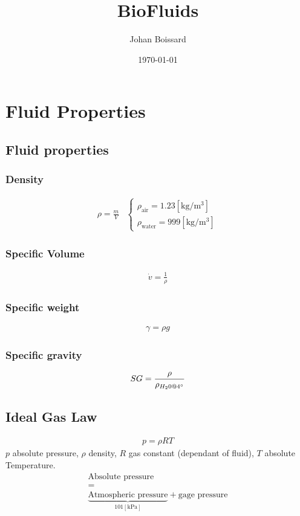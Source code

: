 \documentclass[a4paper]{amsart}
\title{BioFluids}
\author{Johan Boissard}
\date\today
\begin{document}
\twocolumn



\section{Fluid Properties}
\subsection{Fluid properties}
\subsubsection{Density}
\begin{eqnarray*}
	\rho=\frac{m}{V}&
	\begin{cases}
		\rho_\text{air}=1.23 [\text{kg/m$^3$}]\\
		\rho_\text{water}=999 [\text{kg/m$^3$}]
	\end{cases}
\end{eqnarray*}
\subsubsection{Specific Volume}
\begin{eqnarray*}
	\dot v=\frac{1}{\rho}
\end{eqnarray*}
\subsubsection{Specific weight}
\begin{eqnarray*}
	\gamma=\rho g
\end{eqnarray*}
\subsubsection{Specific gravity}
\begin{eqnarray*}
	SG=\frac{\rho}{\rho_{H_20@4\degree}}
\end{eqnarray*}
\subsection{Ideal Gas Law}
\begin{eqnarray*}
	p=\rho RT
\end{eqnarray*}
$p$ absolute pressure, $\rho$ density, $R$ gas constant (dependant of fluid), $T$ absolute Temperature.
\begin{eqnarray*}
	&\text{Absolute pressure} \\&=& \\
	&\underbrace{\text{Atmospheric pressure}}_{101 [\text{kPa}]}
	 + \text{gage pressure}
\end{eqnarray*}
\end{document}
